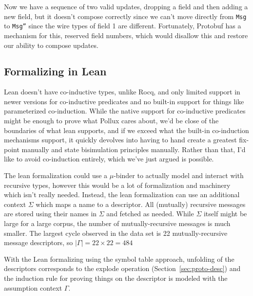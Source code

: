 Now we have a sequence of two valid updates, dropping a field and then adding a
new field, but it doesn't compose correctly since we can't move directly from
\texttt{Msg} to \texttt{Msg''} since the wire types of field 1 are different.
Fortunately, Protobuf has a mechanism for this, reserved field numbers, which
would disallow this and restore our ability to compose updates.

\subsection{Formalizing in Lean}\label{sec:log-rel-lean}

Lean doesn't have co-inductive types, unlike Rocq, and only limited support in
newer versions for co-inductive predicates and no built-in support for things
like parameterized co-induction. While the native support for co-inductive
predicates might be enough to prove what Pollux cares about, we'd be close of
the boundaries of what lean supports, and if we exceed what the built-in
co-induction mechanisms support, it quickly devolves into having to hand create
a greatest fix-point manually and state bisimulation principles manually. Rather
than that, I'd like to avoid co-induction entirely, which we've just argued is
possible.

The lean formalization could use a $\mu$-binder to actually model and interact
with recursive types, however this would be a lot of formalization and machinery
which isn't really needed. Instead, the lean formalization can use an additional
context $\Sigma$ which maps a name to a descriptor. All (mutually) recursive messages
are stored using their names in $\Sigma$ and fetched as needed. While $\Sigma$ itself
might be large for a large corpus, the number of mutually-recursive messages is
much smaller. The largest cycle observed in the data set is 22
mutually-recursive message descriptors, so $|\Gamma| = 22 \times 22 = 484$

With the Lean formalizing using the symbol table approach, unfolding of the
descriptors corresponds to the explode operation (Section~\ref{sec:proto-desc})
and the induction rule for proving things on the descriptor is modeled with the
assumption context $\Gamma$.

